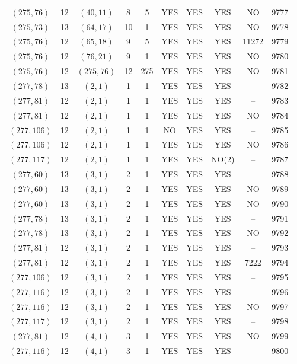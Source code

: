 \begin{longtable}{|c|c|c|c|c|c|c|c|c|c|}
$(275, 76)$ & 12 & $(40, 11)$ & 8 & 5 & YES & YES & YES & NO & 9777\\
$(275, 73)$ & 13 & $(64, 17)$ & 10 & 1 & YES & YES & YES & NO & 9778\\
$(275, 76)$ & 12 & $(65, 18)$ & 9 & 5 & YES & YES & YES & 11272 & 9779\\
$(275, 76)$ & 12 & $(76, 21)$ & 9 & 1 & YES & YES & YES & NO & 9780\\
$(275, 76)$ & 12 & $(275, 76)$ & 12 & 275 & YES & YES & YES & NO & 9781\\
$(277, 78)$ & 13 & $(2, 1)$ & 1 & 1 & YES & YES & YES & -- & 9782\\
$(277, 81)$ & 12 & $(2, 1)$ & 1 & 1 & YES & YES & YES & -- & 9783\\
$(277, 81)$ & 12 & $(2, 1)$ & 1 & 1 & YES & YES & YES & NO & 9784\\
$(277, 106)$ & 12 & $(2, 1)$ & 1 & 1 & NO & YES & YES & -- & 9785\\
$(277, 106)$ & 12 & $(2, 1)$ & 1 & 1 & YES & YES & YES & NO & 9786\\
$(277, 117)$ & 12 & $(2, 1)$ & 1 & 1 & YES & YES & NO(2) & -- & 9787\\
$(277, 60)$ & 13 & $(3, 1)$ & 2 & 1 & YES & YES & YES & -- & 9788\\
$(277, 60)$ & 13 & $(3, 1)$ & 2 & 1 & YES & YES & YES & NO & 9789\\
$(277, 60)$ & 13 & $(3, 1)$ & 2 & 1 & YES & YES & YES & NO & 9790\\
$(277, 78)$ & 13 & $(3, 1)$ & 2 & 1 & YES & YES & YES & -- & 9791\\
$(277, 78)$ & 13 & $(3, 1)$ & 2 & 1 & YES & YES & YES & NO & 9792\\
$(277, 81)$ & 12 & $(3, 1)$ & 2 & 1 & YES & YES & YES & -- & 9793\\
$(277, 81)$ & 12 & $(3, 1)$ & 2 & 1 & YES & YES & YES & 7222 & 9794\\
$(277, 106)$ & 12 & $(3, 1)$ & 2 & 1 & YES & YES & YES & -- & 9795\\
$(277, 116)$ & 12 & $(3, 1)$ & 2 & 1 & YES & YES & YES & -- & 9796\\
$(277, 116)$ & 12 & $(3, 1)$ & 2 & 1 & YES & YES & YES & NO & 9797\\
$(277, 117)$ & 12 & $(3, 1)$ & 2 & 1 & YES & YES & YES & -- & 9798\\
$(277, 81)$ & 12 & $(4, 1)$ & 3 & 1 & YES & YES & YES & NO & 9799\\
$(277, 116)$ & 12 & $(4, 1)$ & 3 & 1 & YES & YES & YES & -- & 9800\\

\end{longtable}

